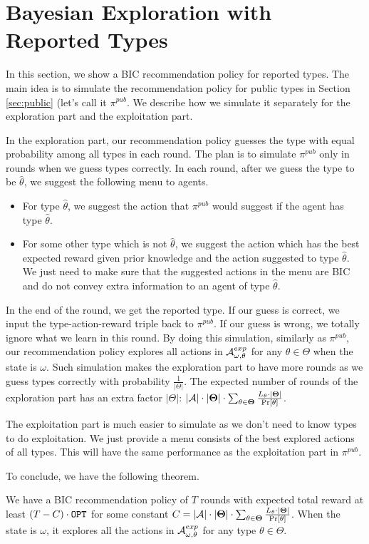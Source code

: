 
\section{Bayesian Exploration with Reported Types}
\label{sec:private_c}
In this section, we show a BIC recommendation policy for reported types. The main idea is to simulate the recommendation policy for public types in Section \ref{sec:public} (let's call it $\pi^{pub}$. We describe how we simulate it separately for the exploration part and the exploitation part. 

In the exploration part, our recommendation policy guesses the type with equal probability among all types in each round. The plan is to simulate $\pi^{pub}$ only in rounds when we guess types correctly. In each round, after we guess the type to be $\hat{\theta}$, we suggest the following menu to agents.
\begin{itemize}
\item For type $\hat{\theta}$, we suggest the action that $\pi^{pub}$ would suggest if the agent has type $\hat{\theta}$. 
\item For some other type which is not $\hat{\theta}$, we suggest the action which has the best expected reward given prior knowledge and the action suggested to type $\hat{\theta}$.  We just need to make sure that the suggested actions in the menu are BIC and do not convey extra information to an agent of type $\hat{\theta}$. 
\end{itemize}
In the end of the round, we get the reported type. If our guess is correct, we input the type-action-reward triple back to $\pi^{pub}$. If our guess is wrong, we totally ignore what we learn in this round. By doing this simulation, similarly as $\pi^{pub}$, our recommendation policy explores all actions in $\mathcal{A}^{exp}_{\omega,\theta}$ for any $\theta \in \varTheta$ when the state is $\omega$. Such simulation makes the exploration part to have more rounds as we guess types correctly with probability $\frac{1}{|\varTheta|}$. The expected number of rounds of the exploration part has an extra factor $|\varTheta|$: $|\mathcal{A}| \cdot |\bold{\Theta}| \cdot \sum_{\theta\in\bold{\Theta}} \frac{L_{\theta}\cdot |\bold{\Theta}|}{\Pr[\theta]}$. 

The exploitation part is much easier to simulate as we don't need to know types to do exploitation. We just provide a menu consists of the best explored actions of all types. This will have the same performance as the exploitation part in $\pi^{pub}$.

To conclude, we have the following theorem.

\begin{theorem}
\label{thm:reported}
We have a BIC recommendation policy of $T$ rounds with expected total reward at least $\left(T - C \right) \cdot \mathtt{OPT}$ for some constant $C = |\mathcal{A}| \cdot |\bold{\Theta}| \cdot \sum_{\theta\in\bold{\Theta}} \frac{L_{\theta}\cdot |\bold{\Theta}|}{\Pr[\theta]}$. When the state is $\omega$, it explores all the actions in $\mathcal{A}^{exp}_{\omega,\theta}$ for any type $\theta \in \varTheta$.
\end{theorem}
